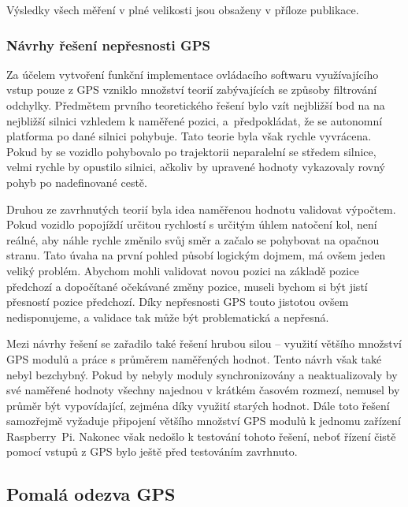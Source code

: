 \documentclass[czech, bachelor]{diploma}
\begin{document}
Výsledky všech měření v plné velikosti jsou obsaženy v příloze publikace.

\subsubsection{Návrhy řešení nepřesnosti GPS}

Za účelem vytvoření funkční implementace ovládacího softwaru využívajícího vstup pouze z GPS vzniklo množství teorií zabývajících
se způsoby filtrování odchylky. Předmětem prvního teoretického řešení bylo vzít nejbližší bod na na nejbližší silnici vzhledem
k naměřené pozici, a~předpokládat, že se autonomní platforma po dané silnici pohybuje. Tato teorie byla však rychle vyvrácena.
Pokud by se vozidlo pohybovalo po trajektorii neparalelní se středem silnice, velmi rychle by opustilo silnici, ačkoliv by
upravené hodnoty vykazovaly rovný pohyb po nadefinované cestě.

Druhou ze zavrhnutých teorií byla idea naměřenou hodnotu validovat výpočtem. Pokud vozidlo popojíždí určitou rychlostí s určitým
úhlem natočení kol, není reálné, aby náhle rychle změnilo svůj směr a začalo se pohybovat na opačnou stranu. Tato úvaha na první
pohled působí logickým dojmem, má ovšem jeden veliký problém. Abychom mohli validovat novou pozici na základě pozice předchozí
a dopočítané očekávané změny pozice, museli bychom si být jistí přesností pozice předchozí. Díky nepřesnosti GPS touto jistotou
ovšem nedisponujeme, a validace tak může být problematická a nepřesná.

Mezi návrhy řešení se zařadilo také řešení hrubou silou -- využití většího množství GPS modulů a práce s průměrem naměřených
hodnot. Tento návrh však také nebyl bezchybný. Pokud by nebyly moduly synchronizovány a neaktualizovaly by své naměřené hodnoty
všechny najednou v krátkém časovém rozmezí, nemusel by průměr být vypovídající, zejména díky využití starých hodnot. Dále toto
řešení samozřejmě vyžaduje připojení většího množství GPS modulů k jednomu zařízení Raspberry~Pi. Nakonec však nedošlo k testování
tohoto řešení, neboť řízení čistě pomocí vstupů z GPS bylo ještě před testováním zavrhnuto.

\subsection{Pomalá odezva GPS} \label{gps-low-polling-rate}
\end{document}

